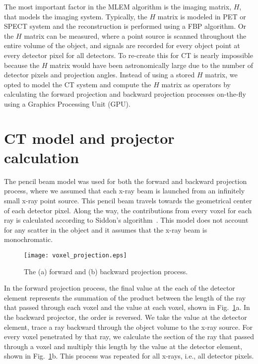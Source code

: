 The most important factor in the MLEM algorithm is the imaging matrix, $H$, that models the imaging system.  Typically, the $H$ matrix is modeled in PET or SPECT system and the reconstruction is performed using a FBP algorithm.  Or the $H$ matrix can be measured, where a point source is scanned throughout the entire volume of the object, and signals are recorded for every object point at every detector pixel for all detectors.  To re-create this for CT is nearly impossible because the $H$ matrix would have been astronomically large due to the number of detector pixels and projection angles.  Instead of using a stored $H$ matrix, we opted to model the CT system and compute the $H$ matrix as operators by calculating the forward projection and backward projection processes on-the-fly using a Graphics Processing Unit (GPU).

\section{CT model and projector calculation}
The pencil beam model was used for both the forward and backward projection process, where we assumed that each x-ray beam is launched from an infinitely small x-ray point source. This pencil beam travels towards the geometrical center of each detector pixel.  Along the way, the contributions from every voxel for each ray is calculated according to Siddon's algorithm~\cite{Siddon1985}.  This model does not account for any scatter in the object and it assumes that the x-ray beam is monochromatic.
%
\begin{figure}[h]
\centering
\texttt{[image: voxel\_projection.eps]}
\caption{The (a) forward and (b) backward projection process.}
\label{fig:voxel_projection}
\end{figure}

In the forward projection process, the final value at the each of the detector element represents the summation of the product between the length of the ray that passed through each voxel and the value at each voxel, shown in Fig.~\ref{fig:voxel_projection}a.  In the backward projector, the order is reversed. We take the value at the detector element, trace a ray backward through the object volume to the x-ray source.  For every voxel penetrated by that ray, we calculate the section of the ray that passed through a voxel and multiply this length by the value at the detector element, shown in Fig.~\ref{fig:voxel_projection}b.  This process was repeated for all x-rays, i.e., all detector pixels.

